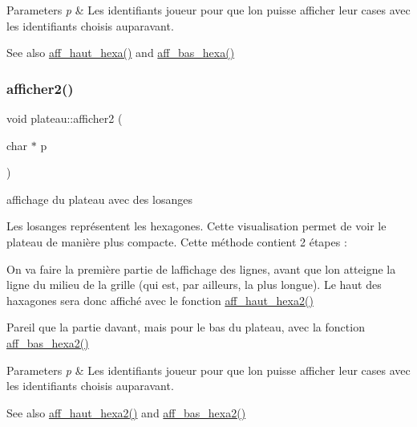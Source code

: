 \begin{DoxyParams}{Parameters}
{\em p} & Les identifiants joueur pour que l\textquotesingle{}on puisse afficher leur cases avec les identifiants choisis auparavant. \\
\hline
\end{DoxyParams}
\begin{DoxySeeAlso}{See also}
\hyperlink{classplateau_ae9f7525df363ec9eab150e6ed312207f}{aff\+\_\+haut\+\_\+hexa()} and \hyperlink{classplateau_a9c40ed64826dc83cd9449d023121d9d7}{aff\+\_\+bas\+\_\+hexa()} 
\end{DoxySeeAlso}
\mbox{\label{classplateau_a999e3e8e2e9b4810fb42dc7e39193019}} 
\subsubsection{\texorpdfstring{afficher2()}{afficher2()}}
{\footnotesize\ttfamily void plateau\+::afficher2 (\begin{DoxyParamCaption}\item[{char $\ast$}]{p }\end{DoxyParamCaption})}



affichage du plateau avec des losanges 

Les losanges représentent les hexagones. Cette visualisation permet de voir le plateau de manière plus compacte. Cette méthode contient 2 étapes \+:
\begin{DoxyEnumerate}
\item On va faire la première partie de l\textquotesingle{}affichage des lignes, avant que l\textquotesingle{}on atteigne la ligne du milieu de la grille (qui est, par ailleurs, la plus longue). Le haut des haxagones sera donc affiché avec le fonction \hyperlink{classplateau_ab720f7c75d770bf0d6381e080e7524b1}{aff\+\_\+haut\+\_\+hexa2()}
\item Pareil que la partie d\textquotesingle{}avant, mais pour le bas du plateau, avec la fonction \hyperlink{classplateau_add9fec84a84fb5b4c101f2056fb7b6cc}{aff\+\_\+bas\+\_\+hexa2()} ~
\end{DoxyEnumerate}


\begin{DoxyParams}{Parameters}
{\em p} & Les identifiants joueur pour que l\textquotesingle{}on puisse afficher leur cases avec les identifiants choisis auparavant. \\
\hline
\end{DoxyParams}
\begin{DoxySeeAlso}{See also}
\hyperlink{classplateau_ab720f7c75d770bf0d6381e080e7524b1}{aff\+\_\+haut\+\_\+hexa2()} and \hyperlink{classplateau_add9fec84a84fb5b4c101f2056fb7b6cc}{aff\+\_\+bas\+\_\+hexa2()} 
\end{DoxySeeAlso}
\mbox{\label{classplateau_a064f80a5451965f1efbe982ff9fc6366}} 
